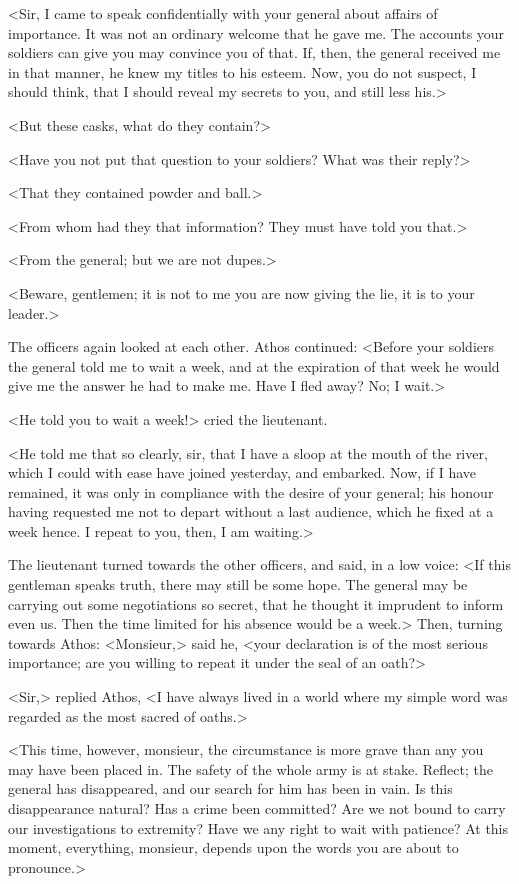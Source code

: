 <Sir, I came to speak confidentially with your general about affairs of importance. It was not an ordinary welcome that he gave me. The accounts your soldiers can give you may convince you of that. If, then, the general received me in that manner, he knew my titles to his esteem. Now, you do not suspect, I should think, that I should reveal my secrets to you, and still less his.>

<But these casks, what do they contain?>

<Have you not put that question to your soldiers? What was their reply?>

<That they contained powder and ball.>

<From whom had they that information? They must have told you that.>

<From the general; but we are not dupes.>

<Beware, gentlemen; it is not to me you are now giving the lie, it is to your leader.>

The officers again looked at each other. Athos continued: <Before your soldiers the general told me to wait a week, and at the expiration of that week he would give me the answer he had to make me. Have I fled away? No; I wait.>

<He told you to wait a week!> cried the lieutenant.

<He told me that so clearly, sir, that I have a sloop at the mouth of the river, which I could with ease have joined yesterday, and embarked. Now, if I have remained, it was only in compliance with the desire of your general; his honour having requested me not to depart without a last audience, which he fixed at a week hence. I repeat to you, then, I am waiting.>

The lieutenant turned towards the other officers, and said, in a low voice: <If this gentleman speaks truth, there may still be some hope. The general may be carrying out some negotiations so secret, that he thought it imprudent to inform even us. Then the time limited for his absence would be a week.> Then, turning towards Athos: <Monsieur,> said he, <your declaration is of the most serious importance; are you willing to repeat it under the seal of an oath?>

<Sir,> replied Athos, <I have always lived in a world where my simple word was regarded as the most sacred of oaths.>

<This time, however, monsieur, the circumstance is more grave than any you may have been placed in. The safety of the whole army is at stake. Reflect; the general has disappeared, and our search for him has been in vain. Is this disappearance natural? Has a crime been committed? Are we not bound to carry our investigations to extremity? Have we any right to wait with patience? At this moment, everything, monsieur, depends upon the words you are about to pronounce.>

